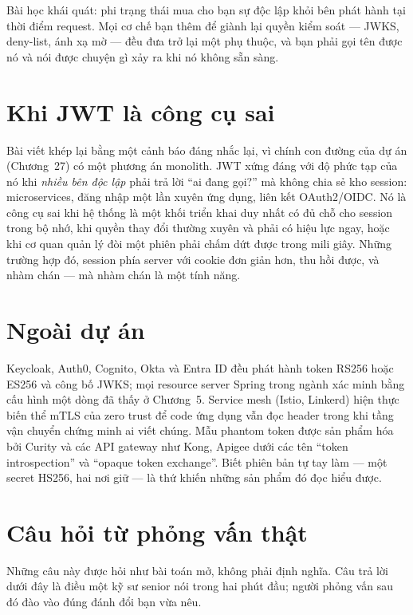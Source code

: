 Bài học khái quát: phi trạng thái mua cho bạn sự độc lập khỏi bên phát
hành tại thời điểm request. Mọi cơ chế bạn thêm để giành lại quyền kiểm
soát --- JWKS, deny-list, ánh xạ mờ --- đều đưa trở lại một phụ thuộc,
và bạn phải gọi tên được nó và nói được chuyện gì xảy ra khi nó không
sẵn sàng.

\section{Khi JWT là công cụ sai}

Bài viết khép lại bằng một cảnh báo đáng nhắc lại, vì chính con đường
của dự án (Chương~27) có một phương án monolith. JWT xứng đáng với độ
phức tạp của nó khi \emph{nhiều bên độc lập} phải trả lời ``ai đang
gọi?'' mà không chia sẻ kho session: microservices, đăng nhập một lần
xuyên ứng dụng, liên kết OAuth2/OIDC. Nó là công cụ sai khi hệ thống là
một khối triển khai duy nhất có đủ chỗ cho session trong bộ nhớ, khi
quyền thay đổi thường xuyên và phải có hiệu lực ngay, hoặc khi cơ quan
quản lý đòi một phiên phải chấm dứt được trong mili giây. Những trường
hợp đó, session phía server với cookie đơn giản hơn, thu hồi được, và
nhàm chán --- mà nhàm chán là một tính năng.

\section{Ngoài dự án}

Keycloak, Auth0, Cognito, Okta và Entra ID đều phát hành token RS256
hoặc ES256 và công bố JWKS; mọi resource server Spring trong ngành xác
minh bằng cấu hình một dòng  đã thấy ở Chương~5.
Service mesh (Istio, Linkerd) hiện thực biến thể mTLS của zero trust để
code ứng dụng vẫn đọc header trong khi tầng vận chuyển chứng minh ai
viết chúng. Mẫu phantom token được sản phẩm hóa bởi Curity và các API
gateway như Kong, Apigee dưới các tên ``token introspection'' và
``opaque token exchange''. Biết phiên bản tự tay làm --- một secret
HS256, hai nơi giữ --- là thứ khiến những sản phẩm đó đọc hiểu được.

\section{Câu hỏi từ phỏng vấn thật}

Những câu này được hỏi như bài toán mở, không phải định nghĩa. Câu trả
lời dưới đây là điều một kỹ sư senior nói trong hai phút đầu; người
phỏng vấn sau đó đào vào đúng đánh đổi bạn vừa nêu.

